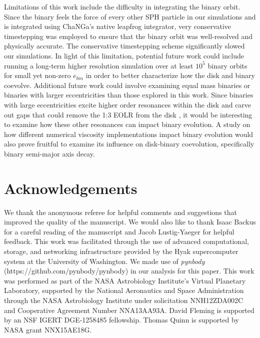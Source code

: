 Limitations of this work include the difficulty in integrating the binary orbit.  Since the binary feels the force of every other SPH particle in our simulations and is 
integrated using ChaNGa's native leapfrog integrator, very conservative timestepping was employed to ensure that the binary orbit was well-resolved and 
physically accurate.  The conservative timestepping scheme significantly slowed our simulations.  In light of this limitation, potential future work could include 
running a long-term higher resolution simulation over at least $10^5$ binary orbits for small yet non-zero $e_{bin}$ in order to better 
characterize how the disk and binary coevolve.  Additional future work could involve examining equal mass binaries or binaries with larger eccentricities than 
those explored in this work.  Since binaries with large eccentricities excite higher order resonances within the disk \citep[e.g.][]{Artymowicz1992,Artymowicz2000} and carve out 
gaps that could remove the 1:3 EOLR from the disk \citep{Artymowicz1994}, it would be interesting to examine how these other resonances can impact binary evolution.  
A study on how different numerical viscosity implementations impact binary evolution would also prove fruitful to examine its influence on disk-binary 
coevolution, specifically binary semi-major axis decay.

\section{Acknowledgements}

We thank the anonymous referee for helpful comments and suggestions that improved the quality
of the manuscript. We would also like to thank Isaac Backus for a careful reading of the manuscript and
Jacob Lustig-Yaeger for helpful feedback. 
This work was facilitated through the use of advanced computational, storage, and networking
infrastructure provided by the Hyak supercomputer system at the
University of Washington.  We made use of {\em pynbody}
(https://github.com/pynbody/pynbody) in our analysis for this paper.
This work was performed as part of the NASA Astrobiology Institute's
Virtual Planetary Laboratory, supported by the National Aeronautics
and Space Administration through the NASA Astrobiology Institute under
solicitation NNH12ZDA002C and Cooperative Agreement Number
NNA13AA93A.  David Fleming is supported by an NSF IGERT DGE-1258485 fellowship.
Thomas Quinn is supported by NASA grant NNX15AE18G.